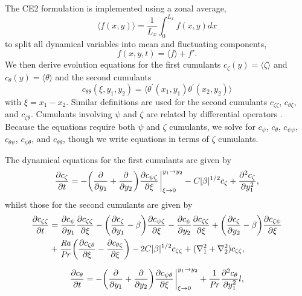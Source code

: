 \documentclass{jfm}
\newcommand{\cz}{c_{\zeta}}
\newcommand{\cs}{c_{\psi}}
\newcommand{\ct}{c_{\theta}}
\newcommand{\css}{c_{\psi \psi}}
\newcommand{\csz}{c_{\psi \zeta}}
\newcommand{\czs}{c_{\zeta \psi}}
\newcommand{\czz}{c_{\zeta \zeta}}
\newcommand{\ctz}{c_{\theta \zeta}}
\newcommand{\czt}{c_{\zeta \theta}}
\newcommand{\ctt}{c_{\theta \theta}}
\newcommand{\cst}{c_{\psi \theta}}
\newcommand{\cts}{c_{\theta \psi}}
\newcommand{\Rayleigh}{\mbox{\textit{Ra}}}  %
\begin{document}
The CE2 formulation is implemented using a zonal average, 
\begin{equation}
\langle f(x,y) \rangle = \frac{1}{L_x} \int_0^{L_x} f(x,y) dx
\end{equation}
to split all dynamical variables into mean and fluctuating components,
\begin{equation}
    f(x,y,t) = \langle f \rangle + f'.
\end{equation}
We then derive evolution equations for the first cumulants $\cz(y) = \langle \zeta \rangle $ and $\ct(y) = \langle \theta \rangle$ and the second cumulants 
\begin{equation}
    \ctt(\xi,y_1,y_2) = \langle \theta^\prime(x_1,y_1) \theta^\prime(x_2,y_2) \rangle
\end{equation}
with $\xi = x_1 - x_2$.
Similar definitions are used for the second cumulants $\czz$, $\ctz$, and $\czt$. 
Cumulants involving $\psi$ and $\zeta$ are related by differential operators \citep{2013PhRvL.110j4502T}.
Because the equations require both $\psi$ and $\zeta$ cumulants, we solve for $\cs$, $\ct$, $\css$, $\cts$, $\cst$, and $\ctt$, though we write equations in terms of $\zeta$ cumulants.

The  dynamical equations for the first cumulants are given by
\begin{equation}
  \label{eq:cz}
  \pdv{\cz}{t} = - \qty(\pdv{y_1} + \pdv{y_2}) \pdv{\csz}{\xi}\eval_{\xi \to 0}^{y_1 \to y_2} - C |\beta|^{1/2} \cz + \pdv[2]{\cz}{y_1},
\end{equation}
whilst those for the second cumulants are given by
\begin{equation}
  \label{eq:czz}
  \begin{split}
    \pdv{\czz}{t} &= \pdv{\cs}{y_1} \pdv{\czz}{\xi} - \qty(\pdv{\cz}{y_1} - \beta) \pdv{\csz}{\xi} - \pdv{\cs}{y_2} \pdv{\czz}{\xi}  + \qty(\pdv{\cz}{y_2} - \beta) \pdv{\czs}{\xi}\\
    &+ \frac{\Rayleigh}{\Pran} \qty(\pdv{\czt}{\xi} -  \pdv{\ctz}{\xi}) - 2C |\beta|^{1/2} \czz + (\nabla_1^2 + \nabla_2^2) \czz,    
  \end{split}
\end{equation}

\begin{equation}
  \label{eq:ct}
  \pdv{\ct}{t} = - \qty(\pdv{y_1} + \pdv{y_2}) \pdv{\cst}{\xi} \eval_{\xi \to 0}^{y_1 \to y_2} + \frac{1}{\Pran} \pdv[2]{\ct}{y_1}l,
\end{equation}
\end{document}
